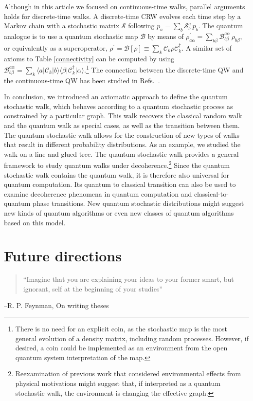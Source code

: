\documentclass[11pt,oneside,final]{huthesis}%
\begin{document}
Although in this article we focused on continuous-time walks,  parallel arguments holds for discrete-time walks.  A discrete-time CRW evolves each time step by a Markov chain with a stochastic matrix $\mathcal{S}$ following $p_a=\sum_b \mathcal{S}_b^a\,p_b$. The quantum analogue is to use a quantum stochastic map $\mathcal{B}$ \cite{Sudarshan61} by means of $\rho^\prime_{a\alpha}=\sum_{b\beta} \mathcal{B}_{b\beta}^{a\alpha}\,\rho_{b\beta}$, or equivalently as a superoperator, $\rho^\prime=\mathcal{B}\left[\rho\right]\equiv\sum_k\mathcal{C}_k\rho\mathcal{C}^\dagger_k$. A similar set of axioms to Table \ref{connectivity} can be computed by using $ \mathcal{B}^{a\alpha}_{b\beta}=\sum_k\langle a \vert\mathcal{C}_k\vert b \rangle \langle \beta \vert\mathcal{C}^\dagger_k\vert \alpha \rangle$.\footnote{There is no need for an explicit coin, as the stochastic map is the most general evolution of a density matrix, including random processes. However, if desired, a coin could be implemented as an environment from the open quantum system interpretation of the map.} The connection between the discrete-time QW and the continuous-time QW has been studied in Refs.~\cite{Strauch06,Childs09}.

In conclusion, we introduced an axiomatic approach to define the
quantum stochastic walk, which behaves according
to a quantum stochastic process as constrained by a particular graph. This walk recovers the classical random walk and the quantum
walk as special cases, as well as the transition between them. The quantum stochastic walk
allows for the construction of new types of walks that result in
different probability distributions. As an example, we studied the
walk on a line and glued tree.  The quantum stochastic walk provides a general framework to
study quantum walks under decoherence.\footnote{Reexamination of previous
work that considered environmental effects from physical motivations
might suggest that, if interpreted as a quantum stochastic walk, the
environment is changing the effective graph.} Since the quantum stochastic walk contains
the quantum walk, it is therefore also universal for quantum computation. Its quantum to classical transition can also be used to examine decoherence phenomena
in quantum computation and classical-to-quantum phase
transitions. New quantum stochastic distributions might suggest new kinds of quantum algorithms
or even new classes of quantum algorithms based on this model.



\chapter{Future directions}\label{chp:conclusion}
\begin{quote}
	``Imagine that you are explaining your ideas to your former smart, but ignorant, self at the beginning of your studies''
\end{quote}
--R. P. Feynman, On writing theses
\end{document}
